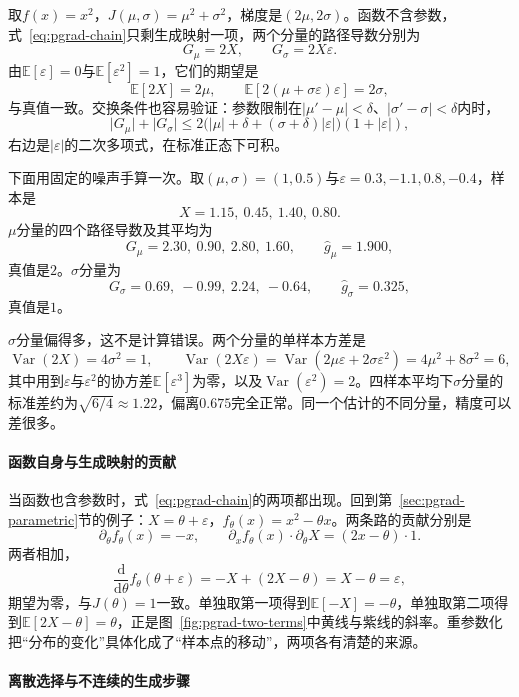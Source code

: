 取$f(x)=x^{2}$，$J(\mu,\sigma)=\mu^{2}+\sigma^{2}$，梯度是$(2\mu,2\sigma)$。函数不含参数，式~\eqref{eq:pgrad-chain}只剩生成映射一项，两个分量的路径导数分别为
\[
  G_{\mu}=2X,\qquad G_{\sigma}=2X\varepsilon .
\]
由$\mathbb{E}[\varepsilon]=0$与$\mathbb{E}[\varepsilon^{2}]=1$，它们的期望是
\[
  \mathbb{E}[2X]=2\mu,\qquad\mathbb{E}[2(\mu+\sigma\varepsilon)\varepsilon]=2\sigma,
\]
与真值一致。交换条件也容易验证：参数限制在$\lvert\mu'-\mu\rvert<\delta$、$\lvert\sigma'-\sigma\rvert<\delta$内时，
\[
  \lvert G_{\mu}\rvert+\lvert G_{\sigma}\rvert\leq2\bigl(\lvert\mu\rvert+\delta+(\sigma+\delta)\lvert\varepsilon\rvert\bigr)(1+\lvert\varepsilon\rvert),
\]
右边是$\lvert\varepsilon\rvert$的二次多项式，在标准正态下可积。

下面用固定的噪声手算一次。取$(\mu,\sigma)=(1,0.5)$与$\varepsilon=0.3,-1.1,0.8,-0.4$，样本是
\[
  X=1.15,\ 0.45,\ 1.40,\ 0.80 .
\]
$\mu$分量的四个路径导数及其平均为
\[
  G_{\mu}=2.30,\ 0.90,\ 2.80,\ 1.60,\qquad\hat{g}_{\mu}=1.900,
\]
真值是$2$。$\sigma$分量为
\[
  G_{\sigma}=0.69,\ -0.99,\ 2.24,\ -0.64,\qquad\hat{g}_{\sigma}=0.325,
\]
真值是$1$。

$\sigma$分量偏得多，这不是计算错误。两个分量的单样本方差是
\[
  \operatorname{Var}(2X)=4\sigma^{2}=1,\qquad\operatorname{Var}(2X\varepsilon)=\operatorname{Var}(2\mu\varepsilon+2\sigma\varepsilon^{2})=4\mu^{2}+8\sigma^{2}=6,
\]
其中用到$\varepsilon$与$\varepsilon^{2}$的协方差$\mathbb{E}[\varepsilon^{3}]$为零，以及$\operatorname{Var}(\varepsilon^{2})=2$。四样本平均下$\sigma$分量的标准差约为$\sqrt{6/4}\approx1.22$，偏离$0.675$完全正常。同一个估计的不同分量，精度可以差很多。

\paragraph{函数自身与生成映射的贡献}

当函数也含参数时，式~\eqref{eq:pgrad-chain}的两项都出现。回到第~\ref{sec:pgrad-parametric}节的例子：$X=\theta+\varepsilon$，$f_{\theta}(x)=x^{2}-\theta x$。两条路的贡献分别是
\[
  \partial_{\theta}f_{\theta}(x)=-x,\qquad\partial_{x}f_{\theta}(x)\cdot\partial_{\theta}X=(2x-\theta)\cdot1 .
\]
两者相加，
\[
  \frac{\mathrm{d}}{\mathrm{d}\theta}f_{\theta}(\theta+\varepsilon)=-X+(2X-\theta)=X-\theta=\varepsilon,
\]
期望为零，与$J(\theta)=1$一致。单独取第一项得到$\mathbb{E}[-X]=-\theta$，单独取第二项得到$\mathbb{E}[2X-\theta]=\theta$，正是图~\ref{fig:pgrad-two-terms}中黄线与紫线的斜率。重参数化把“分布的变化”具体化成了“样本点的移动”，两项各有清楚的来源。

\paragraph{离散选择与不连续的生成步骤}


